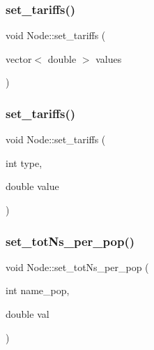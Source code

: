 \mbox{\label{class_node_a81658faf33c82f61e6e774c89c6e3b27}} 
\subsubsection{\texorpdfstring{set\_tariffs()}{set\_tariffs()}\hspace{0.1cm}{\footnotesize\ttfamily [1/2]}}
{\footnotesize\ttfamily void Node\+::set\+\_\+tariffs (\begin{DoxyParamCaption}\item[{vector$<$ double $>$}]{values }\end{DoxyParamCaption})}

\mbox{\label{class_node_a2add3cfb0482a85187c81c709e83a30f}} 
\subsubsection{\texorpdfstring{set\_tariffs()}{set\_tariffs()}\hspace{0.1cm}{\footnotesize\ttfamily [2/2]}}
{\footnotesize\ttfamily void Node\+::set\+\_\+tariffs (\begin{DoxyParamCaption}\item[{int}]{type,  }\item[{double}]{value }\end{DoxyParamCaption})}

\mbox{\label{class_node_a3726d08a6231ebc60bedc80894864dcd}} 
\subsubsection{\texorpdfstring{set\_totNs\_per\_pop()}{set\_totNs\_per\_pop()}}
{\footnotesize\ttfamily void Node\+::set\+\_\+tot\+Ns\+\_\+per\+\_\+pop (\begin{DoxyParamCaption}\item[{int}]{name\+\_\+pop,  }\item[{double}]{val }\end{DoxyParamCaption})}

\mbox{\label{class_node_ae0bb6fae592ffe6d37176185811d22f4}} 
